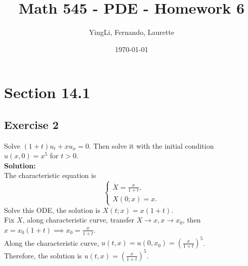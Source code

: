 \documentclass[12pt]{article}%
\begin{document}
\title{Math 545 - PDE - Homework 6}
\author{YingLi, Fernando, Laurette }
\date{\today}
\maketitle

\section*{Section 14.1}
\subsection*{Exercise 2} 
Solve $(1+t)u_{t}+xu_{x}=0$. Then solve it with the initial condition $u(x,0)=x^5$ for $t>0$.\\
\textbf{Solution:}\\
The characteristic equation is 
\begin{equation*}
    \begin{cases}
     \dot{X} =\frac{x}{1+t}, \\
      X(0; x) =x.
    \end{cases}
\end{equation*}
Solve this ODE, the solution is $X(t; x)=x(1+t)$.\\
Fix $X$, along characteristic curve, transfer $X\to x, x\to x_{0}$, then $x=x_{0}(1+t)\implies x_{0}=\frac{x}{1+t} $.\\
Along the characteristic curve, $u(t,x)=u(0,x_{0})=(\frac{x}{1+t})^5$.\\
Therefore, the solution  is $u(t,x)=(\frac{x}{1+t})^5. $
\end{document}
